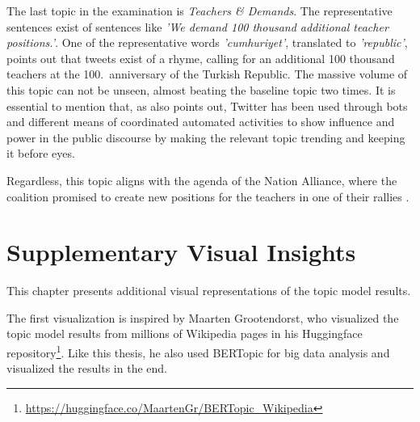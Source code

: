 The last topic in the examination is \textit{Teachers \& Demands}. The representative sentences exist 
of sentences like \textit{'We demand 100 thousand additional teacher positions.'}. One of the 
representative words \textit{'cumhuriyet'}, translated to \textit{'republic'}, points out that tweets 
exist of a rhyme, calling for an additional 100 thousand teachers at the 100.\ anniversary of the Turkish 
Republic. The massive volume of this topic can not be unseen, almost beating the baseline topic two times. 
It is essential to mention that, as \textcite{pfeffer_twitter_24_Hours_just_another_day_2023} also points 
out, Twitter has been used through bots and different means of coordinated automated activities to show 
influence and power in the public discourse by making the relevant topic trending and keeping it before eyes.

Regardless, this topic aligns with the agenda of the Nation Alliance, where the coalition promised to 
create new positions for the teachers in one of their rallies \parencite{trt_ogretmen_atamasi_kk_2023}.


\section{Supplementary Visual Insights}

This chapter presents additional visual representations of the topic model results.  

The first visualization is inspired by Maarten Grootendorst, who visualized the topic model 
results from millions of Wikipedia pages in his Huggingface 
repository\footnote{\url{https://huggingface.co/MaartenGr/BERTopic_Wikipedia}}. Like this thesis, 
he also used BERTopic for big data analysis and visualized the results in the end. 

